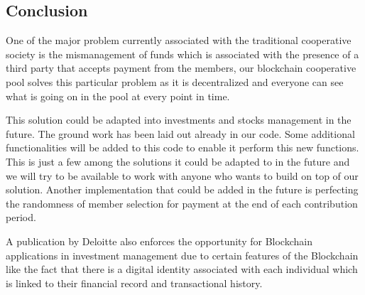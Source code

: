 \documentclass{article}
\begin{document}
\begin{flushleft}
\section{Conclusion}
One of the major problem currently associated with the traditional cooperative society is the mismanagement of funds which is associated with the presence of a third party that accepts payment from the members, our blockchain cooperative pool  solves this particular problem as it is decentralized and everyone can see what is going on in the pool at every point in time.

This solution could be adapted into investments and stocks management in the future. The ground work has been laid out already in our code. Some additional functionalities will be added to this code to enable it perform this new functions. This is just a few among the solutions it could be adapted to in the future and we will try to be available to work with anyone who wants to build on top of our solution. Another implementation that could be added in the future is perfecting the randomness of member selection for payment at the end of each contribution period.

\cite{deloitte} A publication by Deloitte also enforces the opportunity for Blockchain applications in investment management due to certain features of the Blockchain like the fact that there is a digital identity associated with each individual which is linked to their financial record and transactional history.

\end{flushleft}
%
%

\clearpage
\printbibliography
\end{document}
